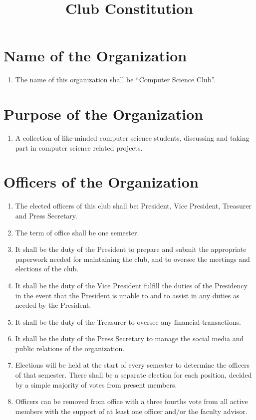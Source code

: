\documentclass[14pt]{article}
\title{Club Constitution}
\begin{document}
\section{Name of the Organization}
\begin{enumerate}
  \item The name of this organization shall be “Computer Science Club”.
\end{enumerate}

\section{Purpose of the Organization}
\begin{enumerate}
  \item A collection of like-minded computer science students, discussing and taking part in computer science related projects.
\end{enumerate}

\section{Officers of the Organization}
\begin{enumerate}
  \item The elected officers of this club shall be: President, Vice President, Treasurer and Press Secretary.
  \item The term of office shall be one semester.
  \item It shall be the duty of the President to prepare and submit the appropriate paperwork needed for maintaining the club, and to oversee the meetings and elections of the club.
  \item It shall be the duty of the Vice President fulfill the duties of the Presidency in the event that the President is unable to and to assist in any duties as needed by the President.
  \item It shall be the duty of the Treasurer to oversee any financial transactions.
  \item It shall be the duty of the Press Secretary to manage the social media and public relations of the organization.
  \item Elections will be held at the start of every semester to determine the officers of that semester. There shall be a separate election for each position, decided by a simple majority of votes from present members.
  \item Officers can be removed from office with a three fourths vote from all active members with the support of at least one officer and/or the faculty advisor.
\end{enumerate}
\end{document}
